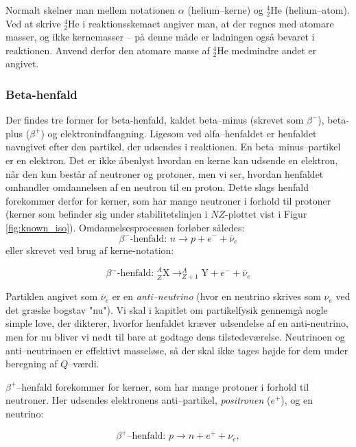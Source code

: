Normalt skelner man mellem notationen $\alpha$ (helium--kerne) og $^4_2\text{He}$ (helium--atom). Ved at skrive $^4_2\text{He}$ i reaktionsskemaet angiver man, at der regnes med atomare masser, og ikke kernemasser -- på denne måde er ladningen også bevaret i reaktionen. Anvend derfor den atomare masse af $^4_2\text{He}$ medmindre andet er angivet.

\subsubsection{Beta-henfald}
Der findes tre former for beta-henfald, kaldet beta--minus (skrevet som $\beta^-$), beta-plus ($\beta^+$) og elektronindfangning. Ligesom ved alfa--henfaldet er henfaldet navngivet efter den partikel, der udsendes i reaktionen. En beta--minus--partikel er en elektron. Det er ikke åbenlyst hvordan en kerne kan udsende en elektron, når den kun består af neutroner og protoner, men vi ser, hvordan henfaldet omhandler omdannelsen af en neutron til en proton. Dette slags henfald forekommer derfor for kerner, som har mange neutroner i forhold til protoner (kerner som befinder sig under stabilitetslinjen i $NZ$-plottet vist i Figur \ref{fig:known_iso}). Omdannelsesprocessen forløber således:
\begin{equation}
\text{$\beta^-$-henfald: }n \rightarrow p + e^- + \bar{\nu}_e
\end{equation}
eller skrevet ved brug af kerne-notation:

\begin{equation}
\text{$\beta^-$-henfald: } ^A_Z\text{X} \rightarrow ^A_{Z+1}\text{Y} + e^- + \bar{\nu}_e
\end{equation}

Partiklen angivet som $\bar{\nu}_e$ er en \emph{anti--neutrino} (hvor en neutrino skrives som $\nu_e$ ved det græske bogstav "nu"). Vi skal i kapitlet om partikelfysik gennemgå nogle simple love, der dikterer, hvorfor henfaldet kræver udsendelse af en anti-neutrino, men for nu bliver vi nødt til bare at godtage dens tilstedeværelse. Neutrinoen og anti--neutrinoen er effektivt masseløse, så der skal ikke tages højde for dem under beregning af $Q$--værdi. 

$\beta^+$--henfald forekommer for kerner, som har mange protoner i forhold til neutroner. Her udsendes elektronens anti--partikel, \emph{positronen} ($e^+$), og en neutrino:

\begin{equation}
\text{$\beta^+$--henfald: } p \rightarrow n + e^+ + \nu_e,
\end{equation} 

